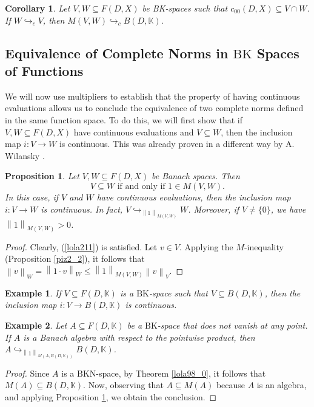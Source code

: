 \documentclass[14pt, a4paper]{article}  %
\newcounter{property}
\providecommand{\pare}[1]{\left( #1\right) }
\providecommand{\norm}[1]{\left\lVert#1\right\rVert}
\newcommand{\K}{\mathbb{K}}
\newcommand{\BK}{\text{BK}}
\newcommand{\BKa}{\text{BKN}}
\newtheorem{corollary}{Corollary}[section]
\newtheorem{proposition}{Proposition}[section]
\newtheorem{example}{Example}[section]  %
\begin{document}
\begin{corollary}
	Let $V, W \subseteq F\pare{D,X}$ be BK-spaces such that $c_{00} (D,X) \subseteq  V \cap W$. If $W\hookrightarrow_{c}V$, then  $M(V,W)\hookrightarrow_{c}B\pare{D,\K}$.
\end{corollary}



	
 

\subsection{Equivalence of Complete Norms in $\BK$  Spaces of Functions}	
 

We will now use multipliers to establish that the property of having continuous evaluations allows us to conclude the equivalence of two complete norms defined in the same function space. To do this, we will first show that if $V, W \subseteq F\pare{D, X}$ have continuous evaluations and $V \subseteq W$, then the inclusion map $i: V \to W$ is continuous. This was already proven in a different way by A. Wilansky \cite[p. 55]{Wil}.

\begin{proposition}\label{d326_0}   
	Let $V, W \subseteq F\pare{D, X}$ be Banach spaces. Then 
	\begin{equation}\label{lola211}
	\text{$V \subseteq W$ if and only if $\mathit{1} \in M\pare{V, W}$.}
	\end{equation} 
	In this case, if $V$ and $W$ have continuous evaluations, then the inclusion map $i: V \to W$ is continuous. In fact, $V \hookrightarrow_{\norm{\mathit{1}}_{M\pare{V, W}}} W$.  	Moreover, if $V \neq \{0\}$, we have $\norm{\mathit{1}}_{M\pare{V, W}} > 0$.
\end{proposition}
\begin{proof} 
	Clearly, (\ref{lola211}) is satisfied. Let $v \in V$. Applying the $M$-inequality (Proposition \ref{piz2_2}), it follows that $\norm{v}_{W} = \norm{\mathit{1} \cdot v}_{W} \leq \norm{\mathit{1}}_{M\pare{V, W}} \norm{v}_{V}$.
\end{proof}

\begin{example}\label{lola189_0}
	If $V \subseteq F\pare{D, \K}$ is a $\BK$-space such that $V \subseteq B\pare{D, \K}$, then the inclusion map $i: V \to B\pare{D, \K}$ is continuous.
\end{example}

\begin{example} 
	Let $A\subseteq F\pare{D,\K}$ be a $\BK$-space that does not vanish at any point. If $A$ is a Banach algebra with respect to the pointwise product, then $A \hookrightarrow_{\norm{\mathit{1}}_{M\pare{A, B\pare{D,\K}}}} B\pare{D,\K}$.
\end{example}
\begin{proof}
	Since $A$ is a $\BKa$-space, by Theorem \ref{lola98_0}, it follows that $M\pare{A} \subseteq B\pare{D,\K}$. Now, observing that $A \subseteq M\pare{A}$ because $A$ is an algebra,  and applying Proposition \ref{d326_0}, we obtain the conclusion.
\end{proof}
\end{document}
